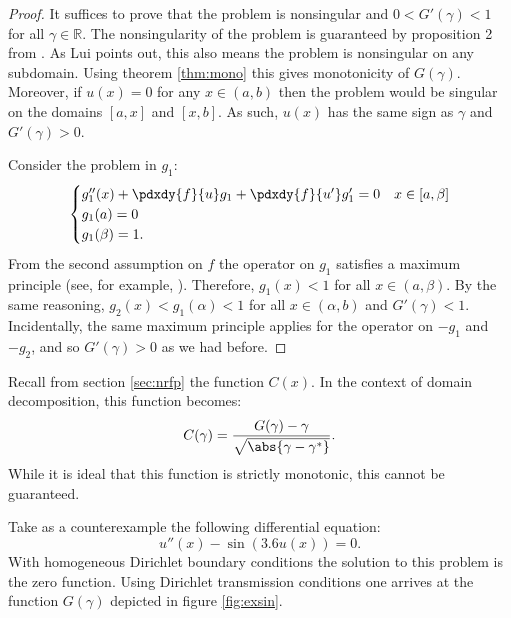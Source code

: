 \documentclass{article}
\begin{document}
\begin{proof}
It suffices to prove that the problem is nonsingular and $0 < G'(\gamma) < 1$ for all $\gamma \in \mathbb{R}$.
The nonsingularity of the problem is guaranteed by proposition 2 from \cite{lui1999schwarz}.
As Lui points out, this also means the problem is nonsingular on any subdomain.
Using theorem \ref{thm:mono} this gives monotonicity of $G(\gamma)$.
Moreover, if $u(x)=0$ for any $x \in (a,b)$ then the problem would be singular on the domains $[a,x]$ and $[x,b]$.
As such, $u(x)$ has the same sign as $\gamma$ and $G'(\gamma) > 0$.

Consider the problem in $g_1$:
\begin{equation*}
\begin{cases} g_1''(x) + \pdxdy{f}{u} g_1 + \pdxdy{f}{u'} g_1' = 0 & x \in [a,\beta] \\ g_1(a) = 0 \\ g_1(\beta) = 1 . \end{cases}
\end{equation*}
From the second assumption on $f$ the operator on $g_1$ satisfies a maximum principle (see, for example, \cite{lui1999schwarz}).
Therefore, $g_1(x) < 1$ for all $x \in (a,\beta)$.
By the same reasoning, $g_2(x) < g_1(\alpha) < 1$ for all $x \in (\alpha, b)$ and $G'(\gamma) < 1$.
Incidentally, the same maximum principle applies for the operator on $-g_1$ and $-g_2$, and so $G'(\gamma) > 0$ as we had before.
\end{proof}

Recall from section \ref{sec:nrfp} the function $C(x)$.
In the context of domain decomposition, this function becomes:
\begin{equation*}
C(\gamma) = \frac{ G(\gamma) - \gamma}{\sqrt{\abs{\gamma - \gamma^*}}} .
\end{equation*}
While it is ideal that this function is strictly monotonic, this cannot be guaranteed.

Take as a counterexample the following differential equation:
\begin{equation*}
u''(x) - \sin(3.6 u(x)) = 0 .
\end{equation*}
With homogeneous Dirichlet boundary conditions the solution to this problem is the zero function.
Using Dirichlet transmission conditions one arrives at the function $G(\gamma)$ depicted in figure \ref{fig:exsin}.
\end{document}
